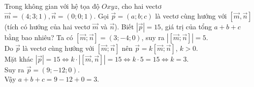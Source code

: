 \begin{ex}%
	Trong không gian với hệ tọa độ $O x y z$, cho hai vectơ $\overrightarrow{m}=(4; 3; 1), \overrightarrow{n}=(0; 0; 1)$. Gọi $\overrightarrow{p}=\left(a;b;c\right)$ là vectơ cùng hướng với $[\overrightarrow{m}, \overrightarrow{n}]$ (tích có hướng của hai vectơ $\overrightarrow{m}$ và $\overrightarrow{n}$). Biết $|\overrightarrow{p}|=15$, giá trị của tổng $a+b+c$ bằng bao nhiêu?
	\loigiai
	{
	Ta có  $[\overrightarrow{m}; \overrightarrow{n}]=(3;-4; 0)$, suy ra $|[\overrightarrow{m}; \overrightarrow{n}]|=5$.\\
	Do $\overrightarrow{p}$ là vectơ cùng hướng với $[\overrightarrow{m}; \overrightarrow{n}]$ nên $\overrightarrow{p}=k[\overrightarrow{m}; \overrightarrow{n}]$, $k>0$.\\
	Mặt khác $|\overrightarrow{p}|=15 \Leftrightarrow k \cdot|[\overrightarrow{m}, \overrightarrow{n}]| =15 \Leftrightarrow k\cdot 5=15 \Leftrightarrow k=3$.\\
	Suy ra $\overrightarrow{p}=(9;-12; 0)$.	\\
	Vậy $a+b+c=9-12+0=3$.
	}
\end{ex}
